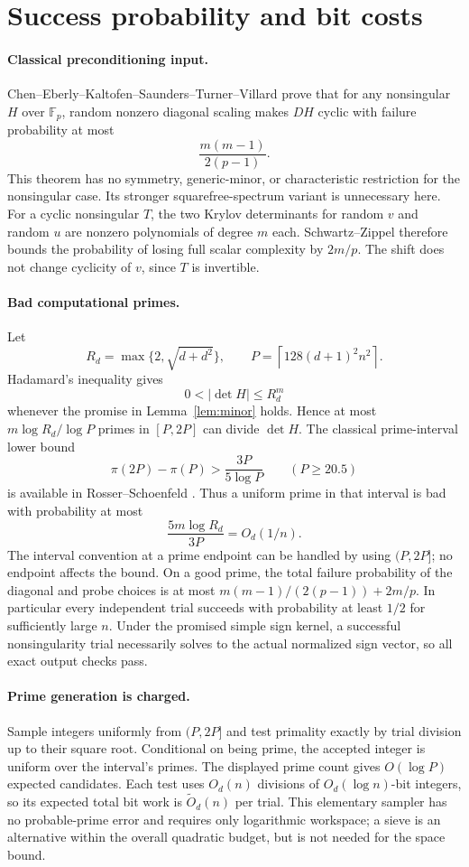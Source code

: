\documentclass[11pt]{article}
\newcommand{\F}{\mathbb F}
\begin{document}
\section{Success probability and bit costs}
\paragraph{Classical preconditioning input.}
Chen--Eberly--Kaltofen--Saunders--Turner--Villard
\cite[Theorem 4.2]{chen} prove that for any nonsingular $H$ over
$\F_p$, random nonzero diagonal scaling makes $DH$ cyclic with
failure probability at most
\[
 \frac{m(m-1)}{2(p-1)}.
\]
This theorem has no symmetry, generic-minor, or characteristic
restriction for the nonsingular case. Its stronger squarefree-spectrum
variant is unnecessary here. For a cyclic nonsingular $T$, the two
Krylov determinants for random $v$ and random $u$ are nonzero
polynomials of degree $m$ each. Schwartz--Zippel therefore bounds
the probability of losing full scalar complexity by $2m/p$.
The shift does not change cyclicity of $v$, since $T$ is invertible.

\paragraph{Bad computational primes.}
Let
\[
 R_d=\max\{2,\sqrt{d+d^2}\},\qquad
 P=\left\lceil128(d+1)^2 n^2\right\rceil.
\]
Hadamard's inequality gives
\[
 0<|\det H|\le R_d^m
\]
whenever the promise in Lemma~\ref{lem:minor} holds. Hence at most
$m\log R_d/\log P$ primes in $[P,2P]$ can divide $\det H$.
The classical prime-interval lower bound
\[
\pi(2P)-\pi(P)>\frac{3P}{5\log P}\qquad(P\ge20.5)
\]
is available in Rosser--Schoenfeld \cite[p.~69, Corollary 3]{rs}.
Thus a uniform prime in that interval is bad with probability at most
\begin{equation}\label{eq:badprime}
 \frac{5m\log R_d}{3P}=O_d(1/n).
\end{equation}
The interval convention at a prime endpoint can be handled by using
$(P,2P]$; no endpoint affects the bound. On a good prime, the total
failure probability of the diagonal and probe choices is at most
$m(m-1)/(2(p-1))+2m/p$. In particular every independent trial
succeeds with probability at least $1/2$ for sufficiently large $n$.
Under the promised simple sign kernel, a successful nonsingularity
trial necessarily solves to the actual normalized sign vector, so
all exact output checks pass.

\paragraph{Prime generation is charged.}
Sample integers uniformly from $(P,2P]$ and test primality exactly
by trial division up to their square root. Conditional on being prime,
the accepted integer is uniform over the interval's primes.
The displayed prime count gives $O(\log P)$ expected candidates.
Each test uses $O_d(n)$ divisions of $O_d(\log n)$-bit integers,
so its expected total bit work is $\widetilde O_d(n)$ per trial.
This elementary sampler has no probable-prime error and requires
only logarithmic workspace; a sieve is an alternative within the
overall quadratic budget, but is not needed for the space bound.
\end{document}
